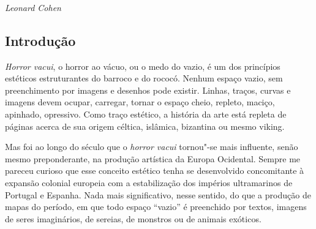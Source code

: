 \movetooddpage
{}
\part*{}

\chapter*{}
\thispagestyle{empty}
\begin{vplace}[30]
\begin{flushright}
\emph{\\[5pt]
Leonard Cohen }
\end{flushright}
\end{vplace}


\chapter{Introdução}


\noindent{}\emph{Horror vacui}, o horror ao vácuo, ou o medo do vazio, é um dos
princípios estéticos estruturantes do barroco e do rococó. Nenhum espaço
vazio, sem preenchimento por imagens e desenhos pode existir. Linhas,
traços, curvas e imagens devem ocupar, carregar, tornar o espaço cheio,
repleto, maciço, apinhado, opressivo. Como traço estético, a história da
arte está repleta de páginas acerca de sua origem céltica, islâmica,
bizantina ou mesmo viking.

Mas foi ao longo do século  que o \emph{horror vacui} tornou"-se mais
influente, senão mesmo preponderante, na produção artística da Europa
Ocidental. Sempre me pareceu curioso que esse conceito estético tenha se
desenvolvido concomitante à expansão colonial europeia com a
estabilização dos impérios ultramarinos de Portugal e Espanha. Nada mais
significativo, nesse sentido, do que a produção de mapas do período, em
que todo espaço ``vazio'' é preenchido por textos, imagens de seres
imaginários, de sereias, de monstros ou de animais exóticos.

